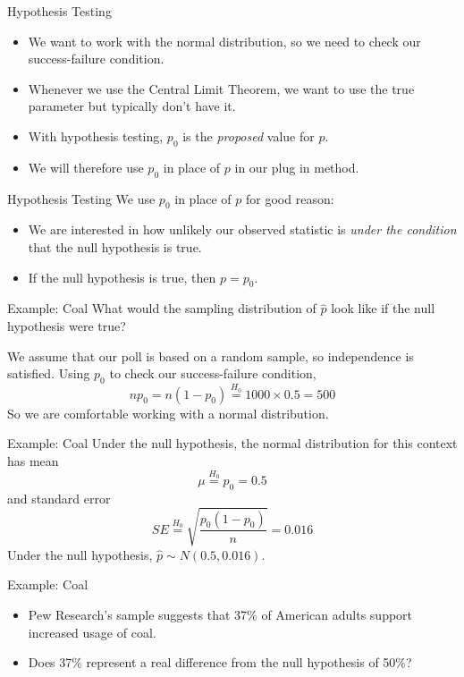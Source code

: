\begin{frame}{Hypothesis Testing}
    \begin{itemize}
        \item We want to work with the normal distribution, so we need to check our success-failure condition.
        \item Whenever we use the Central Limit Theorem, we want to use the true parameter but typically don't have it.
        \item With hypothesis testing, $p_0$ is the \textit{proposed} value for $p$.
        \item We will therefore use $p_0$ in place of $p$ in our plug in method.
    \end{itemize}
\end{frame}

\begin{frame}{Hypothesis Testing}
    We use $p_0$ in place of $p$ for good reason:
    \begin{itemize}
        \item We are interested in how unlikely our observed statistic is \textit{under the condition} that the null hypothesis is true.
        \item If the null hypothesis is true, then $p=p_0$.
    \end{itemize}
\end{frame}

\begin{frame}{Example: Coal}
    What would the sampling distribution of $\hat{p}$ look like if the null hypothesis were true?
    
    \vspace{12pt}We assume that our poll is based on a random sample, so independence is satisfied. Using $p_0$ to check our success-failure condition,
    \[
        np_0 = n(1-p_0) \overset{H_0}{=} 1000\times0.5 = 500
    \]
    So we are comfortable working with a normal distribution.
\end{frame}

\begin{frame}{Example: Coal}
    Under the null hypothesis, the normal distribution for this context has mean
    \[
        \mu \overset{H_0}{=} p_0 = 0.5
    \]
    and standard error
    \[
        SE \overset{H_0}{=} \sqrt{\frac{p_0(1-p_0)}{n}} = 0.016
    \]
    Under the null hypothesis, $\hat{p} \sim N(0.5, 0.016)$.
\end{frame}

\begin{frame}{Example: Coal}
    \begin{itemize}
        \item Pew Research’s sample suggests that 37\% of American adults support increased usage of coal. 
        \item Does 37\% represent a real difference from the null hypothesis of 50\%?
    \end{itemize}
\end{frame}

